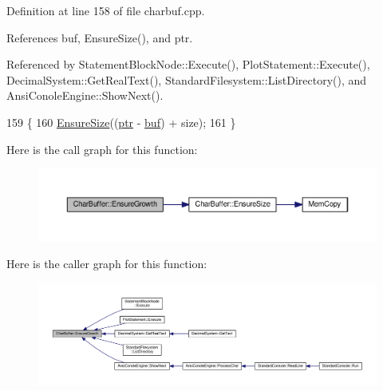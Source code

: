Definition at line 158 of file charbuf.\+cpp.



References buf, Ensure\+Size(), and ptr.



Referenced by Statement\+Block\+Node\+::\+Execute(), Plot\+Statement\+::\+Execute(), Decimal\+System\+::\+Get\+Real\+Text(), Standard\+Filesystem\+::\+List\+Directory(), and Ansi\+Conole\+Engine\+::\+Show\+Next().


\begin{DoxyCode}
159 \{
160     \hyperlink{classCharBuffer_ad1907009b5ad136692b989fa96bf2f7e}{EnsureSize}((\hyperlink{classCharBuffer_a2d313433650506fd6609e6947729dfb0}{ptr} - \hyperlink{classCharBuffer_a8bcd8491b24db4197b311eb361609674}{buf}) + size);
161 \}
\end{DoxyCode}


Here is the call graph for this function\+:
\nopagebreak
\begin{figure}[H]
\begin{center}
\leavevmode
\includegraphics[width=350pt]{dc/d84/classCharBuffer_a73c71d361110b37819a1d681a1504b0e_cgraph}
\end{center}
\end{figure}




Here is the caller graph for this function\+:
\nopagebreak
\begin{figure}[H]
\begin{center}
\leavevmode
\includegraphics[width=350pt]{dc/d84/classCharBuffer_a73c71d361110b37819a1d681a1504b0e_icgraph}
\end{center}
\end{figure}


